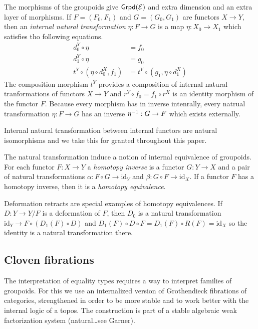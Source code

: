 \documentclass{amsart}
\theoremstyle{plain}
\theoremstyle{definition}
\newcommand\cat\mathcal
\newcommand\id{\mathrm{id}}
\begin{document}
The morphisms of the groupoids give $\grpd(\cat E)$ and extra dimension and an extra layer of morphisms. If $F=(F_0,F_1)$ and $G=(G_0,G_1)$ are functors $X\to Y$, then an \emph{internal natural transformation} $\eta:F\to G$ is a map $\eta:X_0 \to X_1$ which satisfies tho following equations.
\begin{align*}
d^Y_0\circ \eta &= f_0 \\
d^Y_1\circ \eta &= g_0 \\
t^Y\circ(\eta\circ d^X_0,f_1) &= t^Y\circ(g_1,\eta\circ d^X_1)
\end{align*}
The composition morphism $t^Y$ provides a composition of internal natural tranformations of functors $X\to Y$ and $r^Y\circ f_0 = f_1\circ r^X$ is an identity morphism of the functor $F$. Because every morphism has in inverse intenrally, every natrual transformation $\eta:F\to G$ has an inverse $\eta^{-1}:G\to F$ which exists externally.

Internal natural transformation between internal functors are natural isomorphisms and we take this for granted throughout this paper.

The natural transformation induce a notion of internal equivalence of groupoids. For each functor $F:X\to Y$ a \emph{homotopy inverse} is a functor $G:Y\to X$ and a pair of natural transformations $\alpha: F\circ G \to \id_Y$ and $\beta: G\circ F \to \id_X$. If a functor $F$ has a homotopy inverse, then it is a \emph{homotopy equivalence}.

Deformation retracts are special examples of homotopy equivalences. If $D:Y\to Y/F$ is a deformation of $F$, then $D_0$ is a natural transformation $\id_{Y}\to F\circ (D_1(F)\circ D)$ and $D_1(F)\circ D\circ F = D_1(F)\circ R(F) = \id_X$ so the identity is a natural transformation there.

\subsection{Cloven fibrations}
The interpretation of equality types requires a way to interpret families of groupoids. For this we use an internalized version of Grothendieck fibrations of categories, strengthened in order to be more stable and to work better with the internal logic of a topos. The construction is part of a stable algebraic weak factorization system (natural\dots see Garner).
\end{document}
